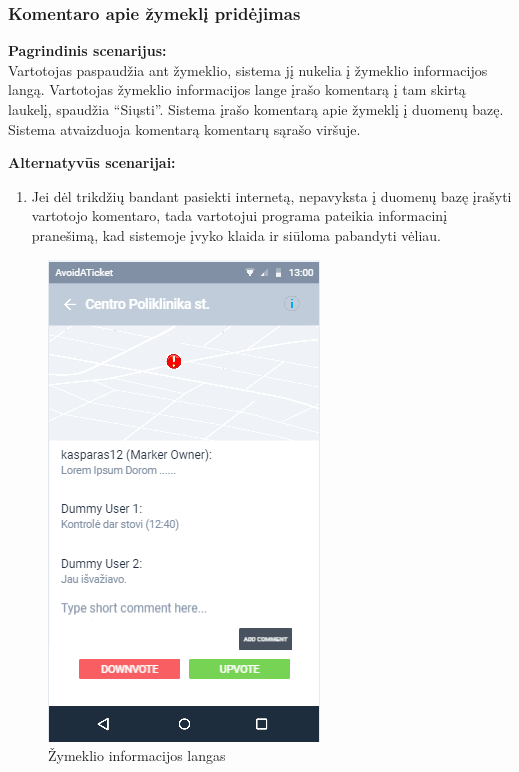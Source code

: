 \documentclass{VUMIFPSkursinis}
\begin{document}
\subsubsection{Komentaro apie žymeklį pridėjimas}
	\textbf{Pagrindinis scenarijus:}\\
    Vartotojas paspaudžia ant žymeklio, sistema jį nukelia į žymeklio informacijos langą. Vartotojas žymeklio informacijos lange 
	įrašo komentarą į tam skirtą laukelį, spaudžia “Siųsti”. Sistema įrašo komentarą apie žymeklį į duomenų bazę. Sistema 
	atvaizduoja komentarą komentarų sąrašo viršuje.

	\textbf{Alternatyvūs scenarijai:}
	\begin{enumerate}
		\item Jei dėl trikdžių bandant pasiekti internetą, nepavyksta į duomenų bazę įrašyti vartotojo komentaro, tada vartotojui programa pateikia informacinį pranešimą, kad sistemoje įvyko klaida ir siūloma pabandyti vėliau.
	\end{enumerate} 
	\begin{figure}[H]
				\centering
				\includegraphics[scale=0.6]{img/mockup_markerInfoWindow}
				\caption{Žymeklio informacijos langas}
				\label{img:Žymeklio informacijos langas}
			\end{figure}
\end{document}
